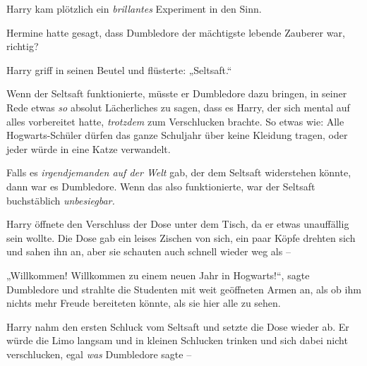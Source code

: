 Harry kam plötzlich ein \emph{brillantes} Experiment in den Sinn.

Hermine hatte gesagt, dass Dumbledore der mächtigste lebende Zauberer war, richtig?

Harry griff in seinen Beutel und flüsterte: „Seltsaft.“

Wenn der Seltsaft funktionierte, müsste er Dumbledore dazu bringen, in seiner Rede etwas \emph{so} absolut Lächerliches zu sagen, dass es Harry, der sich mental auf alles vorbereitet hatte, \emph{trotzdem} zum Verschlucken brachte. So etwas wie: Alle Hogwarts-Schüler dürfen das ganze Schuljahr über keine Kleidung tragen, oder jeder würde in eine Katze verwandelt.

Falls es \emph{irgendjemanden auf der Welt} gab, der dem Seltsaft widerstehen könnte, dann war es Dumbledore. Wenn das also funktionierte, war der Seltsaft buchstäblich \emph{unbesiegbar.}

Harry öffnete den Verschluss der Dose unter dem Tisch, da er etwas unauffällig sein wollte. Die Dose gab ein leises Zischen von sich, ein paar Köpfe drehten sich und sahen ihn an, aber sie schauten auch schnell wieder weg als –

„Willkommen! Willkommen zu einem neuen Jahr in Hogwarts!“, sagte Dumbledore und strahlte die Studenten mit weit geöffneten Armen an, als ob ihm nichts mehr Freude bereiteten könnte, als sie hier alle zu sehen.

Harry nahm den ersten Schluck vom Seltsaft und setzte die Dose wieder ab. Er würde die Limo langsam und in kleinen Schlucken trinken und sich dabei nicht verschlucken, egal \emph{was} Dumbledore sagte –

